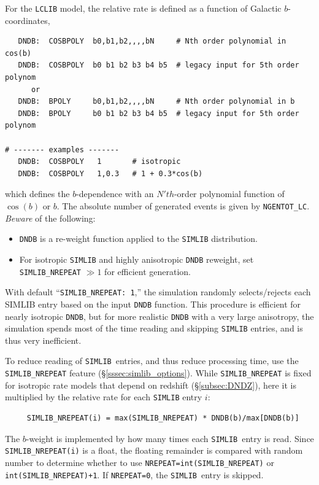 \documentclass[12pt]{article}
\newcommand{\simlib}{{\tt SIMLIB}}
\begin{document}
For the {\tt LCLIB} model, the relative rate is defined as a 
function of Galactic $b$-coordinates,
\begin{verbatim}
   DNDB:  COSBPOLY  b0,b1,b2,,,,bN     # Nth order polynomial in cos(b)
   DNDB:  COSBPOLY  b0 b1 b2 b3 b4 b5  # legacy input for 5th order polynom
      or
   DNDB:  BPOLY     b0,b1,b2,,,,bN     # Nth order polynomial in b
   DNDB:  BPOLY     b0 b1 b2 b3 b4 b5  # legacy input for 5th order polynom 

# ------- examples -------
   DNDB:  COSBPOLY   1       # isotropic
   DNDB:  COSBPOLY   1,0.3   # 1 + 0.3*cos(b)
\end{verbatim}
%
which defines the $b$-dependence with an $N'th$-order
polynomial function of $\cos(b)$ or $b$.
The absolute number of generated events is given by
{\tt NGENTOT\_LC}.  {\it Beware} of the following:
\vspace{-0.4cm}
\begin{itemize}[noitemsep]
  \item {\tt DNDB} is a re-weight function applied to the {\tt SIMLIB} 
         distribution. 
  \item For isotropic {\tt SIMLIB} and highly anisotropic {\tt DNDB}
        reweight, set {\tt SIMLIB\_NREPEAT} $\gg1$ for efficient generation.
\end{itemize}

With default ``{\tt SIMLIB\_NREPEAT: 1},'' the simulation randomly
selects/rejects each SIMLIB entry based on the input {\tt DNDB} function.
This procedure is efficient for nearly isotropic {\tt DNDB},
but for more realistic {\tt DNDB} with a very large anisotropy,
the simulation spends most of the time reading and skipping {\tt SIMLIB}
entries, and is thus very inefficient.

To reduce reading of \simlib\ entries,
and thus reduce processing time, 
use the {\tt SIMLIB\_NREPEAT} feature (\S\ref{sssec:simlib_options}).
While {\tt SIMLIB\_NREPEAT} is fixed for isotropic rate models
that depend on redshift (\S\ref{subsec:DNDZ}), 
here it is multiplied by the relative rate for each {\tt SIMLIB} entry $i$:
\begin{verbatim}
     SIMLIB_NREPEAT(i) = max(SIMLIB_NREPEAT) * DNDB(b)/max[DNDB(b)]
\end{verbatim}
The $b$-weight is implemented by how many times each
\simlib\ entry is read. Since {\tt SIMLIB\_NREPEAT(i)} is a float, 
the floating remainder is compared with random number
to determine whether to use 
{\tt NREPEAT=int(SIMLIB\_NREPEAT)} or {\tt int(SIMLIB\_NREPEAT)+1}.
If {\tt NREPEAT=0}, the \simlib\ entry is skipped.
\end{document}
